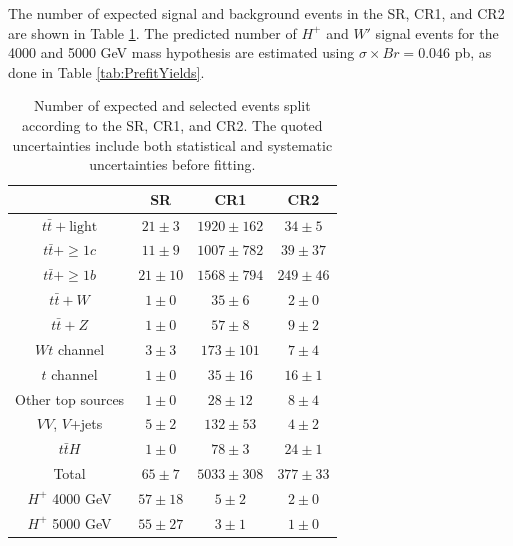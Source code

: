 The number of expected signal and background events in the SR, CR1, and CR2 are shown in Table \ref{tab:PrefitYieldsAbove3TeV}. The predicted number of $H^{+}$ and $W'$ signal events for the 4000 and 5000 GeV mass hypothesis are estimated using $\sigma \times Br = 0.046$ pb, as done in Table \ref{tab:PrefitYields}.

\begin{table}[H]
  \centering
  \begin{tabular*}{130mm}{@{\extracolsep{\fill}}cccc}
    \hline\hline
                            & SR           & CR1             & CR2\\
    \hline
    $t\bar{t}+\text{light}$ & $21 \pm  3$  & $1920 \pm 162$  & $ 34 \pm  5$\\
    $t\bar{t}+\geq1c$       & $11 \pm  9$  & $1007 \pm 782$  & $ 39 \pm 37$\\
    $t\bar{t}+\geq1b$       & $21 \pm 10$  & $1568 \pm 794$  & $249 \pm 46$\\
    $t\bar{t}+W$            & $ 1 \pm  0$  & $  35 \pm   6$  & $  2 \pm  0$\\
    $t\bar{t}+Z$            & $ 1 \pm  0$  & $  57 \pm   8$  & $  9 \pm  2$\\
    $Wt$ channel            & $ 3 \pm  3$  & $ 173 \pm 101$  & $  7 \pm  4$\\
    $t$ channel             & $ 1 \pm  0$  & $  35 \pm  16$  & $ 16 \pm  1$\\
    Other top sources       & $ 1 \pm  0$  & $  28 \pm  12$  & $  8 \pm  4$\\
    $VV$, $V$+jets          & $ 5 \pm  2$  & $ 132 \pm  53$  & $  4 \pm  2$\\
    $t\bar{t}H$             & $ 1 \pm  0$  & $  78 \pm   3$  & $ 24 \pm  1$\\
    \hline
    Total                   & $65 \pm  7$  & $5033 \pm 308$  & $377 \pm 33$\\
    \hline
    $H^{+}$ 4000 GeV        & $57 \pm 18$  & $   5 \pm   2$  & $  2 \pm  0$\\
    $H^{+}$ 5000 GeV        & $55 \pm 27$  & $   3 \pm   1$  & $  1 \pm  0$\\
    \hline\hline
  \end{tabular*}
  \caption{Number of expected and selected events split according to the SR, CR1, and CR2. The quoted uncertainties include both statistical and systematic uncertainties before fitting.}
  \label{tab:PrefitYieldsAbove3TeV}
\end{table}